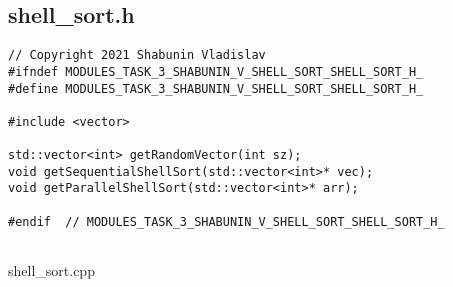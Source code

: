 \documentclass{report}
\begin{document}
 	\subsection*{shell\_sort.h}
 	\begin{lstlisting}
// Copyright 2021 Shabunin Vladislav
#ifndef MODULES_TASK_3_SHABUNIN_V_SHELL_SORT_SHELL_SORT_H_
#define MODULES_TASK_3_SHABUNIN_V_SHELL_SORT_SHELL_SORT_H_

#include <vector>

std::vector<int> getRandomVector(int sz);
void getSequentialShellSort(std::vector<int>* vec);
void getParallelShellSort(std::vector<int>* arr);

#endif  // MODULES_TASK_3_SHABUNIN_V_SHELL_SORT_SHELL_SORT_H_


\end{lstlisting}
shell\_sort.cpp
\end{document}
